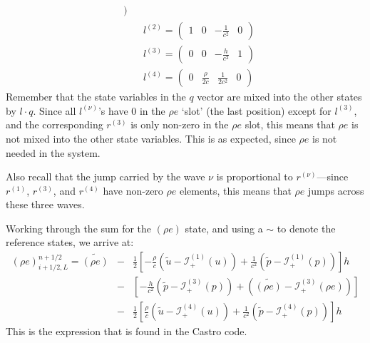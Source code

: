 \begin{itemize}
\begin{eqnarray}
\begin{array}{cccc}
            \end{array} ) \nonumber \\
&&
l^{(2)} = ( \begin{array}{cccc} 1 & 0 & -\frac{1}{c^2} & 0 
            \end{array} ) \nonumber \\
&&
l^{(3)} = ( \begin{array}{cccc} 0 & 0 & -\frac{h}{c^2} & 1 
            \end{array} ) \nonumber \\
&&
l^{(4)} = ( \begin{array}{cccc} 0 & \frac{\rho}{2c} & \frac{1}{2c^2} & 0 
            \end{array} )
\end{eqnarray}
Remember that the state variables in the $q$ vector are mixed into the
other states by $l \cdot q$.  Since all $l^{(\nu)}$'s have $0$ in the
$\rho e$ `slot' (the last position) except for $l^{(3)}$, and the
corresponding $r^{(3)}$ is only non-zero in the $\rho e$ slot, this
means that $\rho e$ is not mixed into the other state variables.  This
is as expected, since $\rho e$ is not needed in the system.

Also recall that the jump carried by the wave $\nu$ is proportional
to $r^{(\nu)}$---since $r^{(1)}$, $r^{(3)}$, and $r^{(4)}$ have
non-zero $\rho e$ elements, this means that $\rho e$ jumps across 
these three waves.

Working through the sum for the $(\rho e)$ state, and using a $\sim$ to
denote the reference states, we arrive at:
\begin{eqnarray}
(\rho e)_{i+1/2,L}^{n+1/2} = \widetilde{(\rho e)} &-&
   \frac{1}{2} \left [ -\frac{\rho}{c} \left (\tilde{u} - \mathcal{I}^{(1)}_+(u) \right )
                       +\frac{1}{c^2} \left (\tilde{p} - \mathcal{I}^{(1)}_+(p) \right )
               \right ] h \nonumber \\
  &-&
    \left [ -\frac{h}{c^2} \left (\tilde{p} - \mathcal{I}^{(3)}_+(p) \right )
                       + \left (\widetilde{(\rho e)} - \mathcal{I}^{(3)}_+(\rho e) \right )
               \right ] \nonumber \\
  &-&
   \frac{1}{2} \left [ \frac{\rho}{c} \left (\tilde{u} - \mathcal{I}^{(4)}_+(u) \right )
                       +\frac{1}{c^2} \left (\tilde{p} - \mathcal{I}^{(4)}_+(p) \right )
               \right ] h 
\end{eqnarray}
This is the expression that is found in the Castro code.



\end{itemize}
